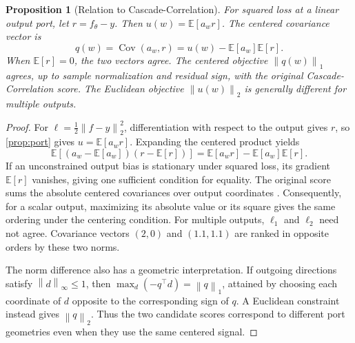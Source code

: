 \documentclass[10pt]{article}
\theoremstyle{paper}
\newtheorem{proposition}[theorem]{Proposition}
\newcommand{\E}{\mathbb E}
\newcommand{\norm}[1]{\left\lVert #1\right\rVert}
\DeclareMathOperator{\Cov}{Cov}
\begin{document}
\begin{proposition}[Relation to Cascade-Correlation]
\label{prop:cascor}
For squared loss at a linear output port, let $r=f_\theta-y$. Then $u(w)=\E[a_wr]$. The centered covariance vector is
\[
q(w)=\Cov(a_w,r)=u(w)-\E[a_w]\E[r].
\]
When $\E[r]=0$, the two vectors agree. The centered objective $\norm{q(w)}_1$ agrees, up to sample normalization and residual sign, with the original Cascade-Correlation score. The Euclidean objective $\norm{u(w)}_2$ is generally different for multiple outputs.
\end{proposition}
\begin{proof}
For $\ell=\tfrac12\norm{f-y}_2^2$, differentiation with respect to the output gives $r$, so \cref{prop:port} gives $u=\E[a_wr]$. Expanding the centered product yields
\[
\E[(a_w-\E[a_w])(r-\E[r])]=\E[a_wr]-\E[a_w]\E[r].
\]
If an unconstrained output bias is stationary under squared loss, its gradient $\E[r]$ vanishes, giving one sufficient condition for equality. The original score sums the absolute centered covariances over output coordinates \citep{fahlman1989cascade}. Consequently, for a scalar output, maximizing its absolute value or its square gives the same ordering under the centering condition. For multiple outputs, $\ell_1$ and $\ell_2$ need not agree. Covariance vectors $(2,0)$ and $(1.1,1.1)$ are ranked in opposite orders by these two norms.

The norm difference also has a geometric interpretation. If outgoing directions satisfy $\norm d_\infty\le1$, then $\max_d(-q^\top d)=\norm q_1$, attained by choosing each coordinate of $d$ opposite to the corresponding sign of $q$. A Euclidean constraint instead gives $\norm q_2$. Thus the two candidate scores correspond to different port geometries even when they use the same centered signal.
\end{proof}
\end{document}
